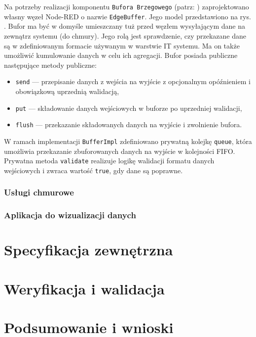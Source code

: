 \documentclass[a4paper, 12pt, twoside]{article}
\begin{document}
Na potrzeby realizacji komponentu \texttt{Bufora Brzegowego} (patrz: )
zaprojektowano własny węzeł Node-RED o nazwie \texttt{EdgeBuffer}.
Jego model przedstawiono na rys. .
Bufor ma być w domyśle umieszczany tuż przed węzłem wysyłającym dane na
zewnątrz systemu (do chmury). Jego rolą jest sprawdzenie, czy przekazane dane
są w zdefiniowanym formacie używanym w warstwie IT systemu. Ma on także umożliwić
kumulowanie danych w celu ich agregacji. Bufor posiada publiczne następujące
metody publiczne:
\begin{itemize}
      \itemsep0em
      \item \texttt{send} --- przepisanie danych z wejścia na wyjście z
            opcjonalnym opóźnieniem i obowiązkową uprzednią walidacją,
      \item \texttt{put} --- składowanie danych wejściowych w buforze po uprzedniej walidacji,
      \item \texttt{flush} --- przekazanie składowanych danych na wyjście
            i zwolnienie bufora.
\end{itemize}
\noindent W ramach implementacji \texttt{BufferImpl} zdefiniowano
prywatną kolejkę \texttt{queue}, która umożliwia przekazanie zbuforowanych
danych na wyjście w kolejności FIFO. Prywatna metoda \texttt{validate} realizuje
logikę walidacji formatu danych wejściowych i zwraca wartość \texttt{true},
gdy dane są poprawne.

\subsubsection{Usługi chmurowe}

\subsubsection{Aplikacja do wizualizacji danych}


\section{Specyfikacja zewnętrzna}\label{spec-wew}

\section{Weryfikacja i walidacja}\label{testy}

\section{Podsumowanie i wnioski}\label{wnioski}

\printbibliography
\end{document}
